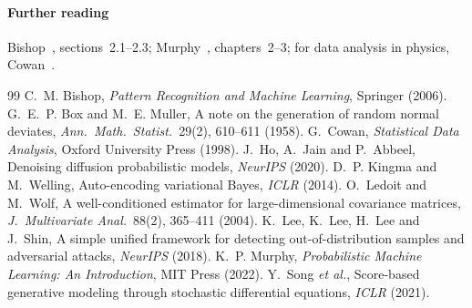 \documentclass[11pt]{article}
\begin{document}
\paragraph{Further reading} Bishop~\cite{bishop2006}, sections~2.1--2.3; Murphy~\cite{murphy2022}, chapters~2--3; for
data analysis in physics, Cowan~\cite{cowan1998}.

\begin{thebibliography}{99}\small
{} C.~M. Bishop, \emph{Pattern Recognition and Machine Learning}, Springer (2006).
 G.~E.~P. Box and M.~E. Muller, A note on the generation of random normal deviates, \emph{Ann.\ Math.\ Statist.}\ 29(2), 610--611 (1958).
 G.~Cowan, \emph{Statistical Data Analysis}, Oxford University Press (1998).
 J.~Ho, A.~Jain and P.~Abbeel, Denoising diffusion probabilistic models, \emph{NeurIPS} (2020).
 D.~P. Kingma and M.~Welling, Auto-encoding variational Bayes, \emph{ICLR} (2014).
 O.~Ledoit and M.~Wolf, A well-conditioned estimator for large-dimensional covariance matrices, \emph{J.\ Multivariate Anal.}\ 88(2), 365--411 (2004).
 K.~Lee, K.~Lee, H.~Lee and J.~Shin, A simple unified framework for detecting out-of-distribution samples and adversarial attacks, \emph{NeurIPS} (2018).
 K.~P. Murphy, \emph{Probabilistic Machine Learning: An Introduction}, MIT Press (2022).
 Y.~Song \emph{et al.}, Score-based generative modeling through stochastic differential equations, \emph{ICLR} (2021).
\end{thebibliography}

\SourceNote
\end{document}

